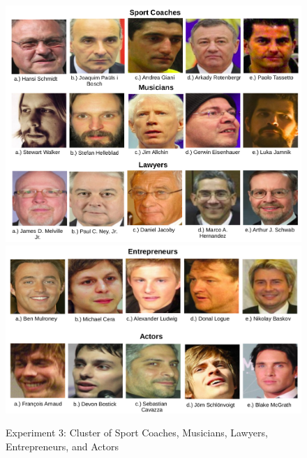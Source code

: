 \documentclass[12pt,english]{article}
\begin{document}
\begin{figure}[!tbp]
 \centering
    \includegraphics[width=\columnwidth]{figures/lawyers.png}
    \includegraphics[width=\columnwidth]{figures/actor.png}
    \caption{Experiment 3: Cluster of Sport Coaches, Musicians, Lawyers, Entrepreneurs, and Actors}
    \label{fig:ex2tp}
\end{figure}
\end{document}
